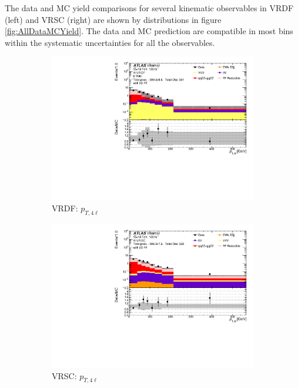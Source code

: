 The data and MC yield comparisons for several kinematic observables in VRDF (left) and VRSC (right) are shown by distributions in figure \ref{fig:AllDataMCYield}. The data and MC prediction are compatible in most bins within the systematic uncertainties for all the observables.

\begin{figure}[htb]
    \centering
    \begin{subfigure}{.48\textwidth}
        \centering
        \includegraphics[width = 0.85\linewidth]{figures/Analysis/Background/Overlay_VRDF_FFApplied_Pt4l.pdf}
        \caption{VRDF: $p_{T,4\ell}$}
    \end{subfigure}
    \begin{subfigure}{.48\textwidth}
        \centering
        \includegraphics[width = 0.85\linewidth]{figures/Analysis/Background/Overlay_VRSC_FFApplied_Pt4l.pdf} 
        \caption{VRSC: $p_{T,4\ell}$} 
    \end{subfigure}\\
    \begin{subfigure}{.48\textwidth}

\end{subfigure}
\end{figure}
